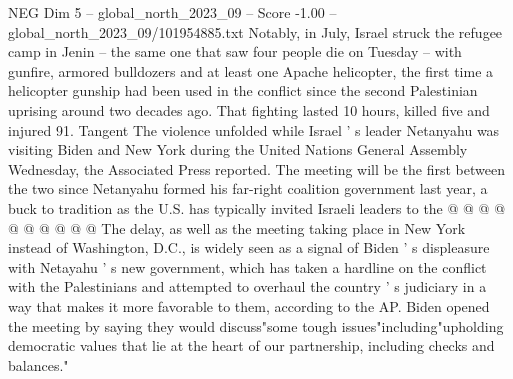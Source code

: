 \begin{textsample}{NEG Dim 5 – global\_north\_2023\_09 – Score -1.00 – global\_north\_2023\_09/101954885.txt}
Notably, in July, Israel struck the refugee camp in Jenin -- the same one that saw four people die on Tuesday -- with gunfire, armored bulldozers and at least one Apache helicopter, the first time a helicopter gunship had been used in the conflict since the second Palestinian uprising around two decades ago.
That fighting lasted 10 hours, killed five and injured 91.
Tangent The violence unfolded while Israel ' s leader Netanyahu was visiting Biden and New York during the United Nations General Assembly Wednesday, the Associated Press reported.
The meeting will be the first between the two since Netanyahu formed his far-right coalition government last year, a buck to tradition as the U.S. has typically invited Israeli leaders to the @ @ @ @ @ @ @ @ @ @ The delay, as well as the meeting taking place in New York instead of Washington, D.C., is widely seen as a signal of Biden ' s displeasure with Netayahu ' s new government, which has taken a hardline on the conflict with the Palestinians and attempted to overhaul the country ' s judiciary in a way that makes it more favorable to them, according to the AP.
Biden opened the meeting by saying they would discuss"some tough issues"including"upholding democratic values that lie at the heart of our partnership, including checks and balances."

\end{textsample}
